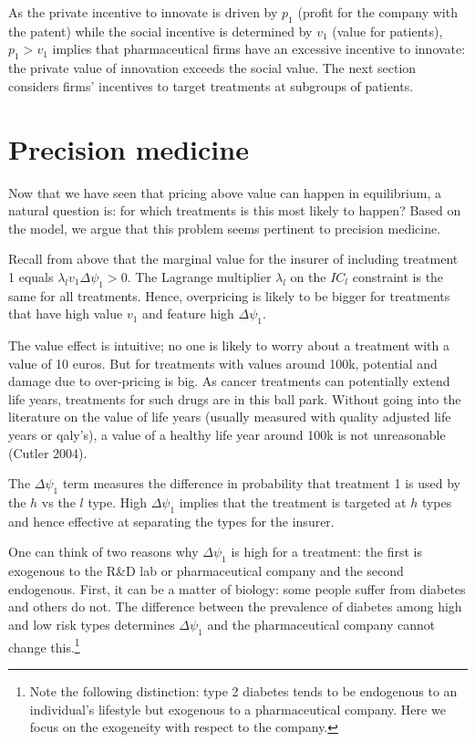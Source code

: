 \documentclass[a4paper,12pt]{article}
\makeatletter
\newcommand{\citeprocitem}[2]{\hyper@linkstart{cite}{citeproc_bib_item_#1}#2\hyper@linkend}
\makeatother
\begin{document}
As the private incentive to innovate is driven by \(p_1\) (profit for the company with the patent) while the social incentive is determined by \(v_1\) (value for patients), \(p_1>v_1\) implies that pharmaceutical firms have an excessive incentive to innovate: the private value of innovation exceeds the social value. The next section considers firms' incentives to target treatments at subgroups of patients.



\section{Precision medicine}
\label{sec:org3cff98b}

Now that we have seen that pricing above value can happen in equilibrium, a natural question is: for which treatments is this most likely to happen? Based on the model, we argue that this problem seems pertinent to precision medicine.

Recall from above that the marginal value for the insurer of including treatment 1 equals \(\lambda_l v_1 \Delta \psi_1 >0\). The Lagrange multiplier \(\lambda_l\) on the \(IC_l\) constraint is the same for all treatments. Hence, overpricing is likely to be bigger for treatments that have high value \(v_1\) and feature high \(\Delta \psi_1\).

The value effect is intuitive; no one is likely to worry about a treatment with a value of 10 euros. But for treatments with values around 100k, potential and damage due to over-pricing is big. As cancer treatments can potentially extend life years, treatments for such drugs are in this ball park. Without going into the literature on the value of life years (usually measured with quality adjusted life years or qaly's), a value of a healthy life year around 100k is not unreasonable (\citeprocitem{9}{Cutler 2004}).

The \(\Delta \psi_1\) term measures the difference in probability that treatment 1 is used by the \(h\) vs the \(l\) type. High \(\Delta \psi_1\) implies that the treatment is targeted at \(h\) types and hence effective at separating the types for the insurer.


One can think of two reasons why \(\Delta \psi_1\) is high for a treatment: the first is exogenous to the R\&D lab or pharmaceutical company and the second endogenous. First, it can be a matter of biology: some people suffer from diabetes and others do not. The difference between the prevalence of diabetes among high and low risk types determines \(\Delta \psi_1\) and the pharmaceutical company cannot change this.\footnote{Note the following distinction: type 2 diabetes tends to be endogenous to an individual's lifestyle but exogenous to a pharmaceutical company. Here we focus on the exogeneity with respect to the company.}
\end{document}
